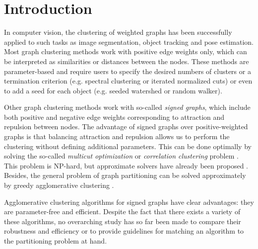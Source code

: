
\section{Introduction}
In computer vision, the clustering of weighted graphs has been successfully applied to such tasks as image segmentation, object tracking and pose estimation. %
Most graph clustering methods work with positive edge weights only, which can be interpreted as similarities or distances between the nodes. These methods are parameter-based and require users to specify the desired numbers of clusters or a termination criterion (e.g. spectral clustering or iterated normalized cuts) or even to add a seed for each object  (e.g. seeded watershed or random walker).  

Other graph clustering methods work with so-called \emph{signed graphs}, which include both positive and negative edge weights corresponding to attraction and repulsion between nodes. The advantage of signed graphs over positive-weighted graphs is that balancing attraction and repulsion allows us to perform the clustering without defining additional parameters. This can be done optimally by solving the so-called \emph{multicut optimization} or \emph{correlation clustering} problem \cite{kappes2011globally,chopra1991multiway}. This problem is NP-hard, but approximate solvers have already been proposed \cite{beier2016efficient}. Besides, the general problem of graph partitioning can be solved approximately by greedy agglomerative clustering \cite{keuper2015efficient,levinkov2017comparative,wolf2018mutex,kardoostsolving}. 


Agglomerative clustering algorithms for signed graphs have clear advantages: they are parameter-free and efficient. Despite the fact that there exists a variety of these algorithms, no overarching study has so far been made to compare their robustness and efficiency or to provide guidelines for matching an algorithm to the partitioning problem at hand. 


